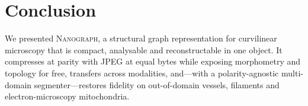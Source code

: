 \documentclass[runningheads]{llncs}
\newcommand{\method}{\textsc{Nanograph}\xspace}
\begin{document}
\section{Conclusion}
We presented \method, a structural graph representation for curvilinear
microscopy that is compact, analysable and reconstructable in one object. It
compresses at parity with JPEG at equal bytes while exposing morphometry and
topology for free, transfers across modalities, and---with a polarity-agnostic
multi-domain segmenter---restores fidelity on out-of-domain vessels, filaments
and electron-microscopy mitochondria.



\end{document}
